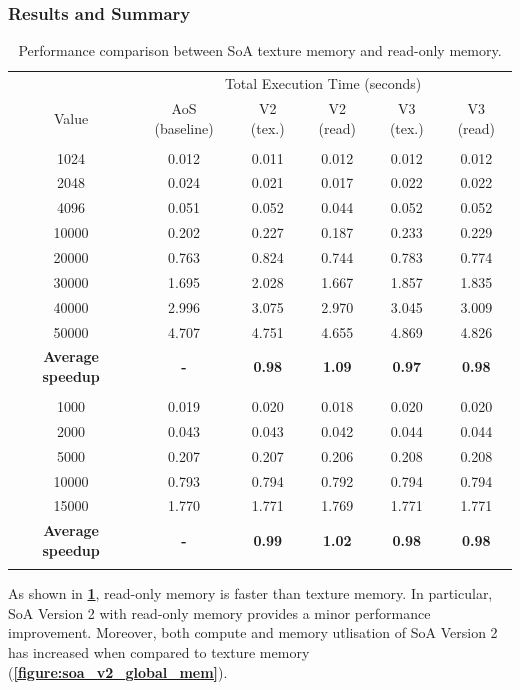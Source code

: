 \documentclass[12pt, a4paper]{article}
\let\oldcref\cref
\renewcommand{\cref}[1]{\textbf{\oldcref{#1}}}
\begin{document}
\subsubsection{Results and Summary}
\renewcommand{\arraystretch}{1.3}
\begin{longtable}{|c|c||c|c||c|c|}
  \hline \endfirsthead & \multicolumn{5}{c|}{Total Execution Time (seconds)} \\ \cline{2-6}
  \multirow{-2}{*}{Value} & AoS (baseline) & V2 (tex.) & V2 (read) & V3 (tex.) & V3 (read) \\ \hline
  \rowcolor{lightgray}\multicolumn{6}{|c|}{\textbf{Number of Bodies (N)}} \\ \hline
  1024  & 0.012 & 0.011 & 0.012 & 0.012 & 0.012 \\
  2048  & 0.024 & 0.021 & 0.017 & 0.022 & 0.022 \\
  4096  & 0.051 & 0.052 & 0.044 & 0.052 & 0.052 \\
  10000 & 0.202 & 0.227 & 0.187 & 0.233 & 0.229 \\
  20000 & 0.763 & 0.824 & 0.744 & 0.783 & 0.774 \\
  30000 & 1.695 & 2.028 & 1.667 & 1.857 & 1.835 \\
  40000 & 2.996 & 3.075 & 2.970 & 3.045 & 3.009 \\
  50000 & 4.707 & 4.751 & 4.655 & 4.869 & 4.826 \\ \hline
  \textbf{Average speedup} & \textbf{-} & \textbf{0.98} & \textbf{1.09} & \textbf{0.97} &
  \textbf{0.98} \\ \hline
  \rowcolor{lightgray}\multicolumn{6}{|c|}{\textbf{Activity Grid Dimension (D)}} \\ \hline
  1000  & 0.019 & 0.020 & 0.018 & 0.020 & 0.020 \\
  2000  & 0.043 & 0.043 & 0.042 & 0.044 & 0.044 \\
  5000  & 0.207 & 0.207 & 0.206 & 0.208 & 0.208 \\
  10000 & 0.793 & 0.794 & 0.792 & 0.794 & 0.794 \\
  15000 & 1.770 & 1.771 & 1.769 & 1.771 & 1.771 \\ \hline
  \textbf{Average speedup} & \textbf{-} & \textbf{0.99} & \textbf{1.02} & \textbf{0.98} &
  \textbf{0.98} \\ \hline
  \caption{Performance comparison between SoA texture memory and read-only memory.}
  \label{table:soa_read_only_mem}
\end{longtable}
\renewcommand{\arraystretch}{1}

As shown in \cref{table:soa_read_only_mem}, read-only memory is faster than texture memory. In
particular, SoA Version 2 with read-only memory provides a minor performance improvement. Moreover,
both compute and memory utlisation of SoA Version 2 has increased when compared to texture memory
(\cref{figure:soa_v2_global_mem}).
\end{document}
